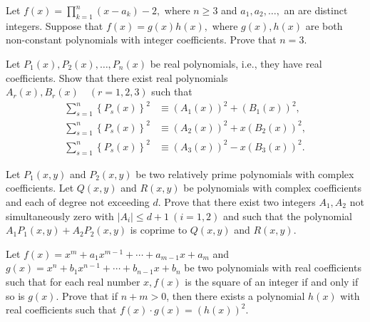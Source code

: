 \documentclass[12pt,a4paper]{memoir}
\theoremstyle{definition}
\begin{document}
\begin{question}[name={1989 IMO Longlist}]
	Let $f(x) = \prod^n_{k=1} (x - a_k) - 2,$ where $ n \geq 3$ and $a_1, a_2, \dots,$ an are distinct integers. Suppose that $f(x) = g(x)h(x),$ where $ g(x), h(x)$ are both non-constant polynomials with integer coefficients. Prove that $n = 3.$
\end{question}


\begin{question}[name={1989 IMO Longlist}]
	Let $ P_1(x), P_2(x), \dots, P_n(x)$ be real polynomials, i.e., they have real coefficients. Show that there exist real polynomials $A_r(x),B_r(x) \quad (r = 1, 2, 3)$ such that
	\begin{align*}
		\sum^n_{s=1} \left\{ P_s(x) \right \}^2 &\equiv \left( A_1(x) \right)^2 + \left( B_1(x) \right)^2,\\
		\sum^n_{s=1} \left\{ P_s(x) \right \}^2 &\equiv \left( A_2(x) \right)^2 + x \left( B_2(x) \right)^2,\\
		\sum^n_{s=1} \left\{ P_s(x) \right \}^2 &\equiv \left( A_3(x) \right)^2 - x \left( B_3(x) \right)^2.
	\end{align*}
\end{question}

\begin{question}[name={1992 IMO Longlist}]
	Let $P_1(x, y)$ and $P_2(x, y)$ be two relatively prime polynomials with complex coefficients. Let $Q(x, y)$ and $R(x, y)$ be polynomials with complex coefficients and each of degree not exceeding $d$. Prove that there exist two integers $A_1, A_2$ not simultaneously zero with $|A_i| \leq d + 1 \  (i = 1, 2)$ and such that the polynomial $A_1P_1(x, y) + A_2P_2(x, y)$ is coprime to $Q(x, y)$ and $R(x, y).$
\end{question}

\begin{question}[name={1992 IMO Longlist}]
	Let $f(x) = x^m + a_1x^{m-1} + \cdots+ a_{m-1}x + a_m$ and $g(x) = x^n + b_1x^{n-1} + \cdots + b_{n-1}x + b_n$ be two polynomials with real coefficients such that for each real number $x, f(x)$ is the square of an integer if and only if so is $g(x)$. Prove that if $n +m > 0$, then there exists a polynomial $h(x)$ with real coefficients such that $f(x) \cdot g(x) = (h(x))^2.$
\end{question}
\end{document}
